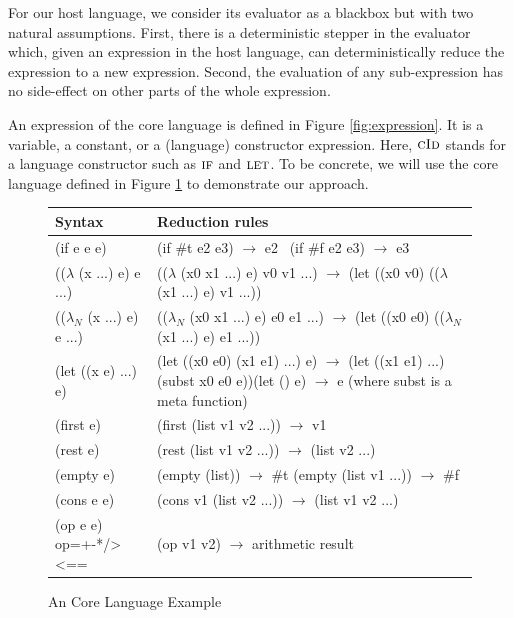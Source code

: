 For our host language, we consider its evaluator as a blackbox but with two natural assumptions. First, there is a deterministic stepper in the evaluator which, given an expression in the host language, can deterministically reduce the expression to a new expression. Second, the evaluation of any sub-expression has no side-effect on other parts of the whole expression.

An expression of the core language is defined in Figure \ref{fig:expression}. It is a variable, a constant, or a (language) constructor expression. Here, $\mbox{\sc cId}$ stands for a language constructor such as $\mbox{\sc if}$ and $\mbox{\sc let}$. To be concrete, we will use the core language defined in Figure \ref{fig:core} to demonstrate our approach.

\begin{figure}[t]
\begin{center}
\begin{tabularx}{.9\textwidth}%
{|>{\setlength{\hsize}{.4\hsize}\centering\arraybackslash}X  |>{\setlength{\hsize}{1.6\hsize}\centering\arraybackslash}X|}
\hline
Syntax & Reduction rules \\ \hline
(if e e e) &\qquad\qquad\qquad(if \#t e2 e3) $\rightarrow$ e2 \newline ~(if \#f e2 e3) $\rightarrow$ e3\\ \hline
(($\lambda$ (x ...) e) e ...) & (($\lambda$ (x0 x1 ...) e) v0 v1 ...) $\rightarrow$ (let ((x0 v0) (($\lambda$ (x1 ...) e) v1 ...))\\ \hline
(($\lambda_N$ (x ...) e) e ...) & (($\lambda_N$ (x0 x1 ...) e) e0 e1 ...) $\rightarrow$ (let ((x0 e0) (($\lambda_N$ (x1 ...) e) e1 ...))\\ \hline
(let ((x e) ...) e) & (let ((x0 e0) (x1 e1) ...) e) $\rightarrow$ (let ((x1 e1) ...) (subst x0 e0 e))\newline (let () e)  $\rightarrow$ e (where subst is a meta function)\\ \hline
(first e) & (first (list v1 v2 ...)) $\rightarrow$ v1\\ \hline
(rest e) & (rest (list v1 v2 ...)) $\rightarrow$ (list v2 ...)\\ \hline
(empty e) & \qquad\qquad\qquad(empty (list)) $\rightarrow$ \#t \newline (empty (list v1 ...)) $\rightarrow$ \#f\\ \hline
(cons e e) & (cons v1 (list v2 ...)) $\rightarrow$ (list v1 v2 ...)\\ \hline
(op e e) \newline op=+-*/><== & (op v1 v2) $\rightarrow$ arithmetic result\\ \hline
\end{tabularx}
\end{center}
\caption{An Core Language Example}
\label{fig:core}
\end{figure}


